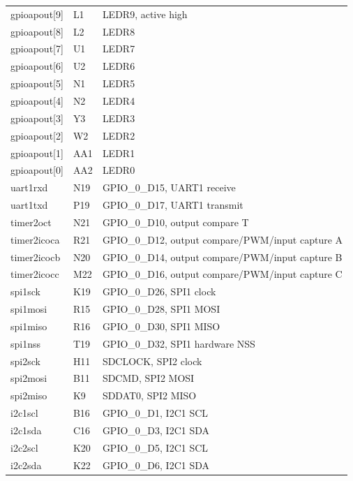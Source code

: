 \documentclass[12pt]{article}
\begin{document}
\begin{longtable}{lll}
gpioapout[9]  & L1       & LEDR9, active high \\
gpioapout[8]  & L2       & LEDR8 \\
gpioapout[7]  & U1       & LEDR7 \\
gpioapout[6]  & U2       & LEDR6 \\
gpioapout[5]  & N1       & LEDR5 \\
gpioapout[4]  & N2       & LEDR4 \\
gpioapout[3]  & Y3       & LEDR3 \\
gpioapout[2]  & W2       & LEDR2 \\
gpioapout[1]  & AA1      & LEDR1 \\
gpioapout[0]  & AA2      & LEDR0 \\
uart1rxd      & N19      & GPIO\_0\_D15, UART1 receive \\
uart1txd      & P19      & GPIO\_0\_D17, UART1 transmit  \\
timer2oct     & N21      & GPIO\_0\_D10, output compare T \\
timer2icoca   & R21      & GPIO\_0\_D12, output compare/PWM/input capture A \\
timer2icocb   & N20      & GPIO\_0\_D14, output compare/PWM/input capture B \\
timer2icocc   & M22      & GPIO\_0\_D16, output compare/PWM/input capture C \\
spi1sck       & K19      & GPIO\_0\_D26, SPI1 clock \\
spi1mosi      & R15      & GPIO\_0\_D28, SPI1 MOSI \\
spi1miso      & R16      & GPIO\_0\_D30, SPI1 MISO \\
spi1nss       & T19      & GPIO\_0\_D32, SPI1 hardware NSS \\
spi2sck       & H11      & SDCLOCK, SPI2 clock \\
spi2mosi      & B11      & SDCMD, SPI2 MOSI \\
spi2miso      & K9       & SDDAT0, SPI2 MISO \\
i2c1scl       & B16      & GPIO\_0\_D1, I2C1 SCL \\
i2c1sda       & C16      & GPIO\_0\_D3, I2C1 SDA \\
i2c2scl       & K20      & GPIO\_0\_D5, I2C1 SCL \\
i2c2sda       & K22      & GPIO\_0\_D6, I2C1 SDA
\end{longtable}
\end{document}
